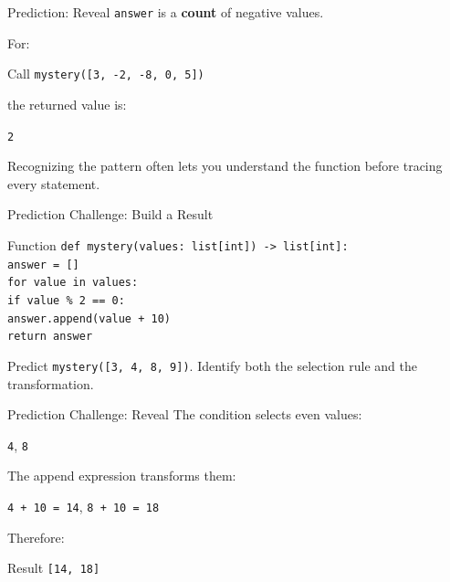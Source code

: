 \documentclass[aspectratio=169,10pt]{beamer}
\begin{document}
\begin{frame}{Prediction: Reveal}
  \texttt{answer} is a \textbf{count} of negative values.

  For:
  \begin{block}{Call}
    \texttt{mystery([3, -2, -8, 0, 5])}
  \end{block}

  the returned value is:
  \begin{center}
    \Large \texttt{2}
  \end{center}

  \begin{keyidea}
    Recognizing the pattern often lets you understand the function before tracing every statement.
  \end{keyidea}
\end{frame}

\begin{frame}{Prediction Challenge: Build a Result}
  \begin{block}{Function}
    \texttt{def mystery(values: list[int]) -> list[int]:}\\
    \hspace{0.20in}\texttt{answer = []}\\
    \hspace{0.20in}\texttt{for value in values:}\\
    \hspace{0.40in}\texttt{if value \% 2 == 0:}\\
    \hspace{0.60in}\texttt{answer.append(value + 10)}\\
    \hspace{0.20in}\texttt{return answer}
  \end{block}

  \begin{activity}
    Predict \texttt{mystery([3, 4, 8, 9])}. Identify both the selection rule and the transformation.
  \end{activity}
\end{frame}

\begin{frame}{Prediction Challenge: Reveal}
  The condition selects even values:
  \begin{center}
    \texttt{4}, \texttt{8}
  \end{center}

  The append expression transforms them:
  \begin{center}
    \texttt{4 + 10 = 14}, \qquad \texttt{8 + 10 = 18}
  \end{center}

  Therefore:
  \begin{block}{Result}
    \texttt{[14, 18]}
  \end{block}
\end{frame}
\end{document}
